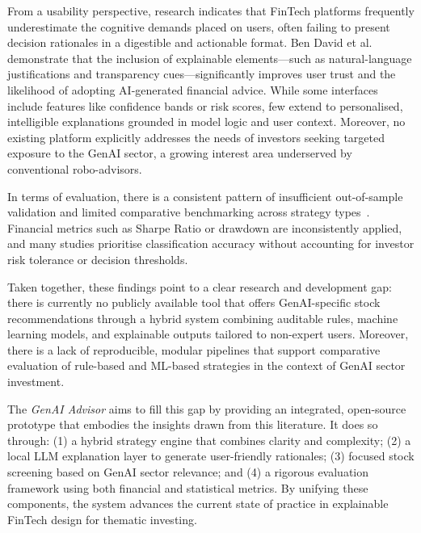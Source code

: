 From a usability perspective, research indicates that FinTech platforms frequently underestimate the cognitive demands placed on users, often failing to present decision rationales in a digestible and actionable format. Ben David et al.~\cite{bendavid2021explainable} demonstrate that the inclusion of explainable elements—such as natural-language justifications and transparency cues—significantly improves user trust and the likelihood of adopting AI-generated financial advice. While some interfaces include features like confidence bands or risk scores, few extend to personalised, intelligible explanations grounded in model logic and user context. Moreover, no existing platform explicitly addresses the needs of investors seeking targeted exposure to the GenAI sector, a growing interest area underserved by conventional robo-advisors.

In terms of evaluation, there is a consistent pattern of insufficient out-of-sample validation and limited comparative benchmarking across strategy types~\cite{bailey2014backtest, kaastra1996forecasting}. Financial metrics such as Sharpe Ratio or drawdown are inconsistently applied, and many studies prioritise classification accuracy without accounting for investor risk tolerance or decision thresholds.

Taken together, these findings point to a clear research and development gap: there is currently no publicly available tool that offers GenAI-specific stock recommendations through a hybrid system combining auditable rules, machine learning models, and explainable outputs tailored to non-expert users. Moreover, there is a lack of reproducible, modular pipelines that support comparative evaluation of rule-based and ML-based strategies in the context of GenAI sector investment.

The \textit{GenAI Advisor} aims to fill this gap by providing an integrated, open-source prototype that embodies the insights drawn from this literature. It does so through: (1) a hybrid strategy engine that combines clarity and complexity; (2) a local LLM explanation layer to generate user-friendly rationales; (3) focused stock screening based on GenAI sector relevance; and (4) a rigorous evaluation framework using both financial and statistical metrics. By unifying these components, the system advances the current state of practice in explainable FinTech design for thematic investing.
